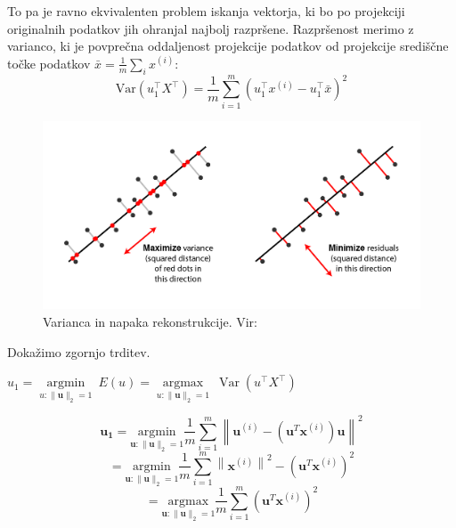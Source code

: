 To pa je ravno ekvivalenten problem iskanja vektorja, ki bo po projekciji originalnih podatkov jih ohranjal najbolj razpršene. Razpršenost merimo z varianco, ki je povprečna oddaljenost projekcije podatkov od projekcije središčne točke podatkov $\bar{x} = \frac{1}{m} \sum_{i} x^{(i)}$:
\begin{equation}
    \mathrm{Var}(u_1^{\top}X^{\top}) = \frac{1}{m} \sum_{i=1}^{m} \left(u_1^{\top}x^{(i)} - u_1^{\top}\bar{x}\right)^2
\end{equation}
\begin{figure}[H]
    \centering
    \includegraphics[width=1\linewidth]{resources/pcaDvaPogleda.png}
    \caption{Varianca in napaka rekonstrukcije. Vir: \cite{quora_pca_explanation}}
    \label{fig:backprop}
\end{figure}

Dokažimo zgornjo trditev.
\begin{trditev}
    $u_{1} = \underset{u:\|\mathbf{u}\|_2=1}{\operatorname{argmin}}\ E(u) = \underset{u:\|\mathbf{u}\|_2=1}{\operatorname{argmax}}\ \operatorname{Var}(u^{\top}X^{\top})$
\end{trditev}
\begin{dokaz}
    \begin{equation}
\mathbf{u_{1}} = \underset{\mathbf{u}:\|\mathbf{u}\|_2=1}{\mathrm{argmin}} \frac{1}{m} \sum_{i=1}^{m} \left\| \mathbf{u}^{(i)} - (\mathbf{u}^T \mathbf{x}^{(i)})\mathbf{u} \right\|^2
\end{equation}
\begin{equation}
= \underset{\mathbf{u}:\|\mathbf{u}\|_2=1}{\mathrm{argmin}} \frac{1}{m} \sum_{i=1}^{m} \left\| \mathbf{x}^{(i)} \right\|^2 - (\mathbf{u}^T \mathbf{x}^{(i)})^2
\end{equation}
\begin{equation}
= \underset{\mathbf{u}:\|\mathbf{u}\|_2=1}{\mathrm{argmax}} \frac{1}{m} \sum_{i=1}^{m} (\mathbf{u}^T \mathbf{x}^{(i)})^2
\end{equation}
\end{dokaz} \cite{gormley2018pca} \\
